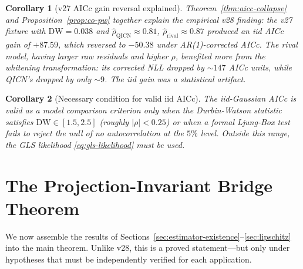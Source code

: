 \documentclass[11pt]{article}
\newtheorem{corollary}{Corollary}
\begin{document}
\begin{corollary}[v27 AICc gain reversal explained]
Theorem~\ref{thm:aicc-collapse} and Proposition~\ref{prop:co-pw} together explain the empirical v28 finding: the v27 fixture with $\mathrm{DW}=0.038$ and $\hat\rho_{\mathrm{QICN}}\approx 0.81$, $\hat\rho_{\mathrm{rival}}\approx 0.87$ produced an iid AICc gain of $+87.59$, which reversed to $-50.38$ under AR(1)-corrected AICc. The rival model, having larger raw residuals and higher $\rho$, benefited more from the whitening transformation: its corrected NLL dropped by $\sim 147$ AICc units, while QICN's dropped by only $\sim 9$. The iid gain was a statistical artifact.
\end{corollary}

\begin{corollary}[Necessary condition for valid iid AICc]
The iid-Gaussian AICc is valid as a model comparison criterion only when the Durbin-Watson statistic satisfies $\mathrm{DW}\in[1.5,2.5]$ (roughly $|\rho|<0.25$) or when a formal Ljung-Box test fails to reject the null of no autocorrelation at the $5\%$ level. Outside this range, the GLS likelihood \eqref{eq:gls-likelihood} must be used.
\end{corollary}

\section{The Projection-Invariant Bridge Theorem}
\label{sec:bridge}

We now assemble the results of Sections~\ref{sec:estimator-existence}--\ref{sec:lipschitz} into the main theorem. Unlike v28, this is a proved statement---but only under hypotheses that must be independently verified for each application.
\end{document}
